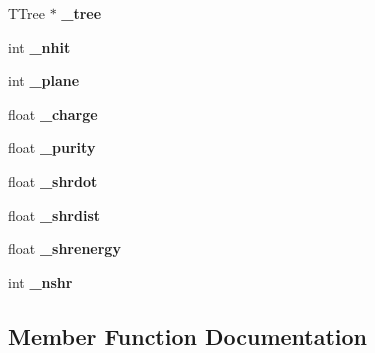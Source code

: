\begin{DoxyCompactItemize}
\item 
T\+Tree $\ast$ {\bfseries \+\_\+tree}\hypertarget{classProtonHitPurity_a099b95a1f761865698b3518566f161d7}{}\label{classProtonHitPurity_a099b95a1f761865698b3518566f161d7}

\item 
int {\bfseries \+\_\+nhit}\hypertarget{classProtonHitPurity_a6844c4cad1d4dde899d327788ffb1fbe}{}\label{classProtonHitPurity_a6844c4cad1d4dde899d327788ffb1fbe}

\item 
int {\bfseries \+\_\+plane}\hypertarget{classProtonHitPurity_aaa0874bba49cd73ac89fe3453f5e64d1}{}\label{classProtonHitPurity_aaa0874bba49cd73ac89fe3453f5e64d1}

\item 
float {\bfseries \+\_\+charge}\hypertarget{classProtonHitPurity_a517cc8f0dfc9a9a0ad5d9fc93df7c20d}{}\label{classProtonHitPurity_a517cc8f0dfc9a9a0ad5d9fc93df7c20d}

\item 
float {\bfseries \+\_\+purity}\hypertarget{classProtonHitPurity_a189e155a01fe3e39248465acddc04a8c}{}\label{classProtonHitPurity_a189e155a01fe3e39248465acddc04a8c}

\item 
float {\bfseries \+\_\+shrdot}\hypertarget{classProtonHitPurity_af81a5c842b98e216cc147e6df4b89946}{}\label{classProtonHitPurity_af81a5c842b98e216cc147e6df4b89946}

\item 
float {\bfseries \+\_\+shrdist}\hypertarget{classProtonHitPurity_ac45672d1231ae74ac9ffa9d5f7872de2}{}\label{classProtonHitPurity_ac45672d1231ae74ac9ffa9d5f7872de2}

\item 
float {\bfseries \+\_\+shrenergy}\hypertarget{classProtonHitPurity_a4a83bd7758deeddbc8356ceb61e1ba7f}{}\label{classProtonHitPurity_a4a83bd7758deeddbc8356ceb61e1ba7f}

\item 
int {\bfseries \+\_\+nshr}\hypertarget{classProtonHitPurity_aee140d918772b3317099286660d08f1e}{}\label{classProtonHitPurity_aee140d918772b3317099286660d08f1e}

\end{DoxyCompactItemize}


\subsection{Member Function Documentation}
